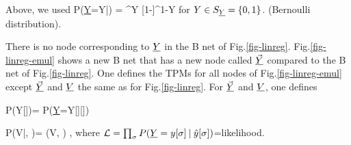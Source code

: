 Above, we used 
\beq
P(\ul{Y}=Y|) = ^{Y}
[1-]^{1-Y}
\eeq
for $Y\in S_{\underline{Y}}=\{0,1\}$. (Bernoulli distribution).

There is no node corresponding to $\underline{Y}$
in the B net of Fig.\ref{fig-linreg}.
Fig.\ref{fig-linreg-emul} shows a new B net
that has a new node called $\vec{\underline{Y}}$
compared to the B net of Fig.\ref{fig-linreg}.
One defines the TPMs
for all nodes of Fig.\ref{fig-linreg-emul}
except $\vec{\underline{Y}}$ and $\underline{V}$ the same
as for Fig.\ref{fig-linreg}. For $\vec{\underline{Y}}$
and $\underline{V}$, one defines

\beq\color{blue}
P(Y[\sigma]\cond {})=
P(\ul{Y}=Y[\sigma]\cond {}[\sigma])
\eeq

\beq\color{blue}
P(V|, \vecy)=
\delta(V, \ln \call)
\;,
\eeq
where ${\cal L} =\prod_\sigma P(\underline{Y}=y[\sigma]{\:\mathbf{|}\:} \hat{y}[\sigma] )$=likelihood.


